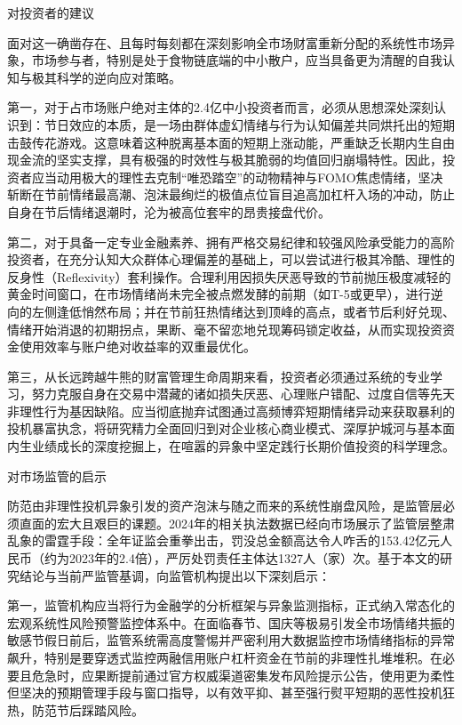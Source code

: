 \documentclass{cupb-thesis}
\begin{document}
对投资者的建议

面对这一确凿存在、且每时每刻都在深刻影响全市场财富重新分配的系统性市场异象，市场参与者，特别是处于食物链底端的中小散户，应当具备更为清醒的自我认知与极其科学的逆向应对策略。


第一，对于占市场账户绝对主体的2.4亿中小投资者而言，必须从思想深处深刻认识到：节日效应的本质，是一场由群体虚幻情绪与行为认知偏差共同烘托出的短期击鼓传花游戏。这意味着这种脱离基本面的短期上涨动能，严重缺乏长期内生自由现金流的坚实支撑，具有极强的时效性与极其脆弱的均值回归崩塌特性。因此，投资者应当动用极大的理性去克制“唯恐踏空”的动物精神与FOMO焦虑情绪，坚决斩断在节前情绪最高潮、泡沫最绚烂的极值点位盲目追高加杠杆入场的冲动，防止自身在节后情绪退潮时，沦为被高位套牢的昂贵接盘代价。

第二，对于具备一定专业金融素养、拥有严格交易纪律和较强风险承受能力的高阶投资者，在充分认知大众群体心理偏差的基础上，可以尝试进行极其冷酷、理性的反身性（Reflexivity）套利操作。合理利用因损失厌恶导致的节前抛压极度减轻的黄金时间窗口，在市场情绪尚未完全被点燃发酵的前期（如T-5或更早），进行逆向的左侧逢低悄然布局；并在节前狂热情绪达到顶峰的高点，或者节后利好兑现、情绪开始消退的初期拐点，果断、毫不留恋地兑现筹码锁定收益，从而实现投资资金使用效率与账户绝对收益率的双重最优化。

第三，从长远跨越牛熊的财富管理生命周期来看，投资者必须通过系统的专业学习，努力克服自身在交易中潜藏的诸如损失厌恶、心理账户错配、过度自信等先天非理性行为基因缺陷。应当彻底抛弃试图通过高频博弈短期情绪异动来获取暴利的投机暴富执念，将研究精力全面回归到对企业核心商业模式、深厚护城河与基本面内生业绩成长的深度挖掘上，在喧嚣的异象中坚定践行长期价值投资的科学理念。


对市场监管的启示

防范由非理性投机异象引发的资产泡沫与随之而来的系统性崩盘风险，是监管层必须直面的宏大且艰巨的课题。2024年的相关执法数据已经向市场展示了监管层整肃乱象的雷霆手段：全年证监会重拳出击，罚没总金额高达令人咋舌的153.42亿元人民币（约为2023年的2.4倍），严厉处罚责任主体达1327人（家）次。基于本文的研究结论与当前严监管基调，向监管机构提出以下深刻启示：


第一，监管机构应当将行为金融学的分析框架与异象监测指标，正式纳入常态化的宏观系统性风险预警监控体系中。在面临春节、国庆等极易引发全市场情绪共振的敏感节假日前后，监管系统需高度警惕并严密利用大数据监控市场情绪指标的异常飙升，特别是要穿透式监控两融信用账户杠杆资金在节前的非理性扎堆堆积。在必要且危急时，应果断提前通过官方权威渠道密集发布风险提示公告，使用更为柔性但坚决的预期管理手段与窗口指导，以有效平抑、甚至强行熨平短期的恶性投机狂热，防范节后踩踏风险。
\end{document}

